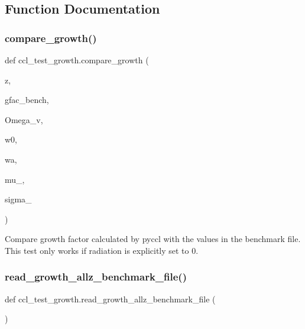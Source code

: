 \subsection{Function Documentation}
\mbox{\label{namespaceccl__test__growth_a27927b78f1df23384bee9dca46f09ad1}} 
\subsubsection{\texorpdfstring{compare\+\_\+growth()}{compare\_growth()}}
{\footnotesize\ttfamily def ccl\+\_\+test\+\_\+growth.\+compare\+\_\+growth (\begin{DoxyParamCaption}\item[{}]{z,  }\item[{}]{gfac\+\_\+bench,  }\item[{}]{Omega\+\_\+v,  }\item[{}]{w0,  }\item[{}]{wa,  }\item[{}]{mu\+\_,  }\item[{}]{sigma\+\_ }\end{DoxyParamCaption})}

\begin{DoxyVerb}Compare growth factor calculated by pyccl with the values in the benchmark
file. This test only works if radiation is explicitly set to 0.
\end{DoxyVerb}
 \mbox{\label{namespaceccl__test__growth_a2f8c205fa1a57bf8d2b31752e4798701}} 
\subsubsection{\texorpdfstring{read\+\_\+growth\+\_\+allz\+\_\+benchmark\+\_\+file()}{read\_growth\_allz\_benchmark\_file()}}
{\footnotesize\ttfamily def ccl\+\_\+test\+\_\+growth.\+read\+\_\+growth\+\_\+allz\+\_\+benchmark\+\_\+file (\begin{DoxyParamCaption}{ }\end{DoxyParamCaption})}

